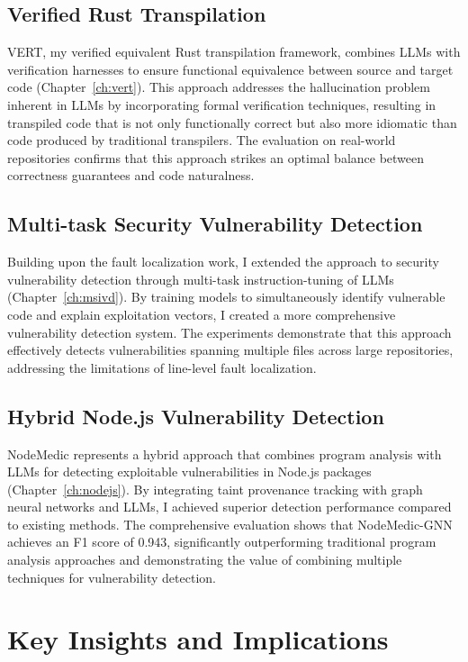 \subsection{Verified Rust Transpilation}

VERT, my verified equivalent Rust transpilation framework, combines LLMs with verification harnesses to ensure functional equivalence between source and target code (Chapter~\ref{ch:vert}). This approach addresses the hallucination problem inherent in LLMs by incorporating formal verification techniques, resulting in transpiled code that is not only functionally correct but also more idiomatic than code produced by traditional transpilers. The evaluation on real-world repositories confirms that this approach strikes an optimal balance between correctness guarantees and code naturalness.

\subsection{Multi-task Security Vulnerability Detection}

Building upon the fault localization work, I extended the approach to security vulnerability detection through multi-task instruction-tuning of LLMs (Chapter~\ref{ch:msivd}). By training models to simultaneously identify vulnerable code and explain exploitation vectors, I created a more comprehensive vulnerability detection system. The experiments demonstrate that this approach effectively detects vulnerabilities spanning multiple files across large repositories, addressing the limitations of line-level fault localization.

\subsection{Hybrid Node.js Vulnerability Detection}

NodeMedic represents a hybrid approach that combines program analysis with LLMs for detecting exploitable vulnerabilities in Node.js packages (Chapter~\ref{ch:nodejs}). By integrating taint provenance tracking with graph neural networks and LLMs, I achieved superior detection performance compared to existing methods. The comprehensive evaluation shows that NodeMedic-GNN achieves an F1 score of 0.943, significantly outperforming traditional program analysis approaches and demonstrating the value of combining multiple techniques for vulnerability detection.

\section{Key Insights and Implications}

